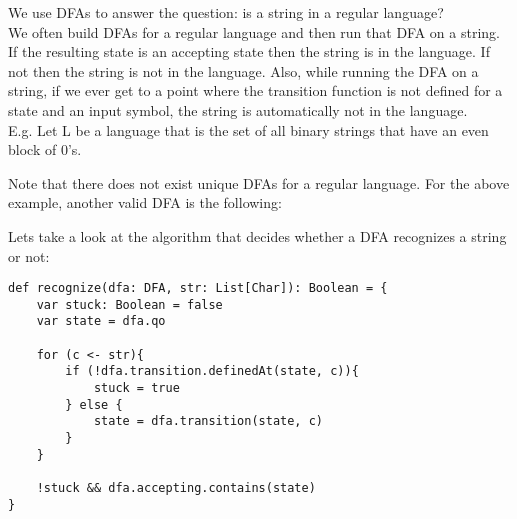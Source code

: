 \documentclass[12pt, letterpaper]{article}
\begin{document}
We use DFAs to answer the question: is a string in a regular language?\\

We often build DFAs for a regular language and then run that DFA on a string. If the resulting state is an accepting state then the string is in the language. If not then the string is not in the language. Also, while running the DFA on a string, if we ever get to a point where the transition function is not defined for a state and an input symbol, the string is automatically not in the language.\\

E.g. Let L be a language that is the set of all binary strings that have an even block of 0's.\\
\begin{center}
\end{center}

Note that there does not exist unique DFAs for a regular language. For the above example, another valid DFA is the following:
\begin{center}
\end{center}

Lets take a look at the algorithm that decides whether a DFA recognizes a string or not:
\begin{lstlisting}
def recognize(dfa: DFA, str: List[Char]): Boolean = {
	var stuck: Boolean = false
	var state = dfa.qo
	
	for (c <- str){
		if (!dfa.transition.definedAt(state, c)){
			stuck = true
		} else {
			state = dfa.transition(state, c)
		}		
	}
	
	!stuck && dfa.accepting.contains(state)
}
\end{lstlisting}
\end{document}
